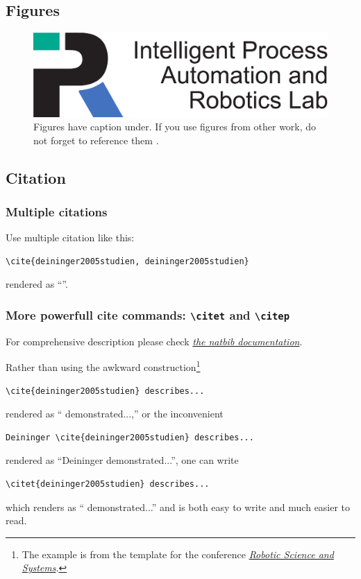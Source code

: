 \subsection{Figures}
\begin{figure}[H]
    \centering
    \includegraphics[width=0.8\columnwidth]{Logos/KIT-Departments/IPRLogo_en}
    \caption{Figures have caption under. If you use figures from other work, do not forget to reference them \cite{deininger2005studien}.}
    \label{fig:figure_caption}
\end{figure}

\subsection{Citation}

\subsubsection{Multiple citations}
Use multiple citation like this:
{\small
\begin{verbatim}
\cite{deininger2005studien, deininger2005studien}
\end{verbatim}
}
rendered as ``\cite{deininger2005studien, deininger2005studien}''.


\subsubsection{More powerfull cite commands: \texttt{\textbackslash citet} and \texttt{\textbackslash citep}}
For comprehensive description please check \href{http://merkel.texture.rocks/Latex/natbib.php}{\textit{the natbib documentation}}.

Rather than using the awkward construction\footnote{The example is from the template for the conference \href{http://www.roboticsconference.org/information/authorinfo/}{\textit{Robotic Science and Systems}}.}
{\small
\begin{verbatim}
\cite{deininger2005studien} describes...
\end{verbatim}
}
\noindent
rendered as ``\cite{deininger2005studien} demonstrated...,'' or the inconvenient
{\small
\begin{verbatim}
Deininger \cite{deininger2005studien} describes...
\end{verbatim}
}
\noindent
rendered as ``Deininger \cite{deininger2005studien} demonstrated...'', one can write
{\small
\begin{verbatim}
\citet{deininger2005studien} describes...
\end{verbatim}
}
\noindent
which renders as ``\citet{deininger2005studien} demonstrated...'' and is
both easy to write and much easier to read.


